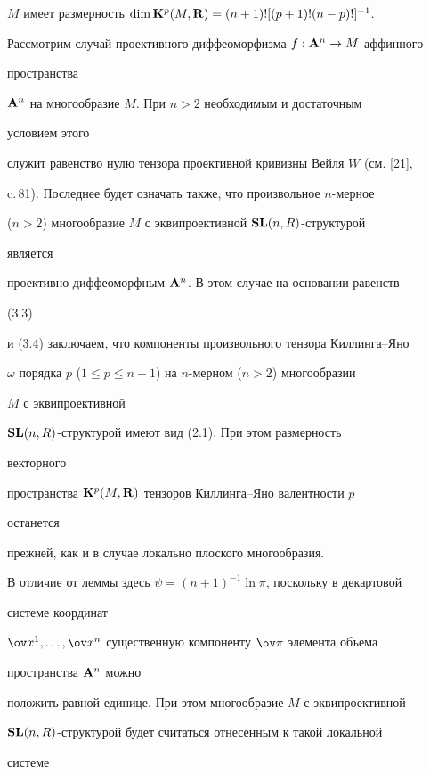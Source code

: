 $M$ имеет размерность $\dim\bold K^p(M,\bold 


R)=(n+1)![(p+1)!(n-p)!]^{-1}$. 


 


Рассмотрим случай проективного диффеоморфизма $f:\bold A^n\to M$ аффинного 


пространства 


$\bold A^n$ на многообразие $M$. При $n>2$ необходимым и достаточным 


условием этого 


служит равенство нулю тензора проективной кривизны Вейля $W$ (см. [21], 


c.\,81). Последнее будет означать также, что произвольное $n$-мерное 


($n>2$) многообразие $M$ с эквипроективной $\bold {SL}(n,R)$-структурой 


является 


проективно диффеоморфным $\bold A^n$. В этом случае на основании равенств 


(3.3) 


и (3.4) заключаем, что компоненты произвольного тензора Киллинга--Яно 


$\omega$ порядка $p$ ($1\le p\le n-1$) на $n$-мерном ($n>2$) многообразии 


$M$ с эквипроективной 


$\bold {SL}(n,R)$-структурой имеют вид (2.1). При этом размерность 


векторного 


пространства $\bold K^p(M,\bold R)$ тензоров Киллинга--Яно валентности $p$ 


останется 


прежней, как и в случае локально плоского многообразия. 


 


В отличие от леммы здесь $\psi=(n+1)^{-1}\ln\pi$, поскольку в декартовой 


системе координат 


$\ov x^1,\dotsc,\ov x^n$ существенную компоненту $\ov\pi$ элемента объема 


пространства $\bold A^n$ можно 


положить равной единице. При этом многообразие $M$ с эквипроективной 


$\bold {SL}(n,R)$-структурой будет считаться отнесенным к такой локальной 


системе 


